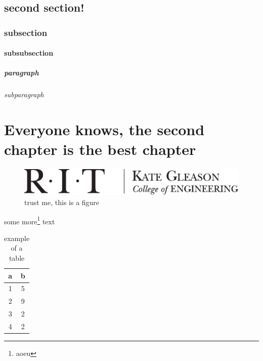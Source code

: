 \documentclass{ritthesis}
\begin{document}
\section{second section!}

\subsection{subsection}

\subsubsection{subsubsection}

\paragraph{paragraph}

\subparagraph{subparagraph}

\lipsum{}
\chapter{Everyone knows, the second chapter is the best chapter}
\lipsum{}

\begin{figure}
\centering
\includegraphics{kgcoelogohoriz}
\caption{trust me, this is a figure}
\label{fig:samp}
\end{figure}

some more\footnote{aoeu} text

\begin{table}
\centering
\caption{example of a table}
\label{tab:samp}
\begin{tabular}{cc}
\toprule
a		& b\\
\midrule
1		& 5\\
2		& 9\\
3		& 2\\
4		& 2\\
\bottomrule
\end{tabular}
\end{table}
\end{document}
